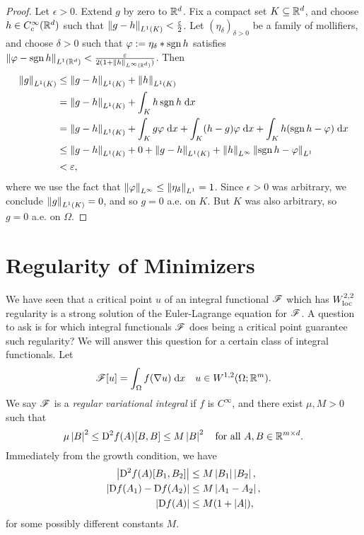 \begin{proof}
    Let $\epsilon > 0$. Extend $g$ by zero to $\mathbb{R}^d$. Fix a compact set $K \subseteq \mathbb{R}^d$, and choose $h \in C_c^\infty(\mathbb{R}^d)$ such that $\left\lVert { g - h } \right\rVert_{L^1(K)} < \frac{\varepsilon}{2}$. Let $(\eta_\delta)_{\delta > 0}$ be a family of mollifiers, and choose $\delta > 0$ such that $\varphi := \eta_\delta \ast \operatorname{sgn}{h}$ satisfies $\left\lVert { \varphi- \operatorname{sgn}{h} } \right\rVert_{L^1(\mathbb{R}^d) } < \frac{\varepsilon}{2(1+\left\lVert {h} \right\rVert_{L^\infty(\mathbb{R}^d)})}$. Then 
    \begin{equation} \begin{aligned}
        \left\lVert {g} \right\rVert_{L^1(K)} &\leq \left\lVert { g - h } \right\rVert_{L^1(K)} + \left\lVert {h} \right\rVert_{L^1(K)}    \\
                          &=    \left\lVert {g-h} \right\rVert_{L^1(K)} + \int_K h \operatorname{sgn}{h} \; \mathrm{d} x \\
                          &=    \left\lVert {g-h} \right\rVert_{L^1(K)} + \int_K g\varphi \; \mathrm{d} x + \int_K (h-g)\varphi \; \mathrm{d} x + \int_K h(\operatorname{sgn}{h} - \varphi) \;        \mathrm{d} x                                           \\
                          &\leq \left\lVert {g-h} \right\rVert_{L^1(K)} + 0  + \left\lVert {g-h} \right\rVert_{L^1(K)} + \left\lVert {h} \right\rVert_{L^\infty}\left\lVert {\operatorname{sgn}{h}-\varphi} \right\rVert_{L^1} \\
                          &<    \varepsilon,
    \end{aligned} \end{equation}
    where we use the fact that $\left\lVert {\varphi} \right\rVert_{L^\infty} \leq \left\lVert {\eta_\delta} \right\rVert_{L^1} = 1$. Since $\epsilon > 0$ was arbitrary, we conclude $\left\lVert {g} \right\rVert_{L^1(K)} = 0$, and so $g = 0$ a.e. on $K$. But $K$ was also arbitrary, so $g = 0$ a.e. on $\Omega$.
\end{proof}

\section{Regularity of Minimizers}
We have seen that a critical point $u$ of an integral functional $\mathscr{F}$ which has $W^{2,2}_{\rm loc}$ regularity is a strong solution of the Euler-Lagrange equation for $\mathscr{F}$. A question to ask is for which integral functionals $\mathscr{F}$ does being a critical point guarantee such regularity? We will answer this question for a certain class of integral functionals. Let 
\begin{equation}
    \mathscr{F}[u] = \int_\Omega f(\nabla u) \; \mathrm{d} x \quad u \in W^{1,2}(\Omega;\mathbb{R}^m).
\end{equation}
We say $\mathscr{F}$ is a \textit{regular variational integral} if $f$ is $C^\infty$, and there exist $\mu,M > 0$ such that
\begin{equation}
    \mu \left\lvert {B} \right\rvert^2 \leq \mathrm{D}^2 f(A)[B,B] \leq M \left\lvert {B} \right\rvert^2 \quad \text{for all } A,B \in \mathbb{R}^{m \times d}.
\end{equation}
Immediately from the growth condition, we have 
\begin{align}
    \left\lvert {\mathrm{D}^2 f(A)[B_1,B_2]} \right\rvert &\leq M \left\lvert {B_1} \right\rvert\left\lvert {B_2} \right\rvert, \\
    \left\lvert {\mathrm{D}f(A_1) - \mathrm{D}f(A_2)} \right\rvert &\leq M\left\lvert {A_1 - A_2} \right\rvert, \\
    \left\lvert {\mathrm{D}f(A)} \right\rvert &\leq M(1 + \left\lvert {A} \right\rvert),
\end{align}
for some possibly different constants $M$.

